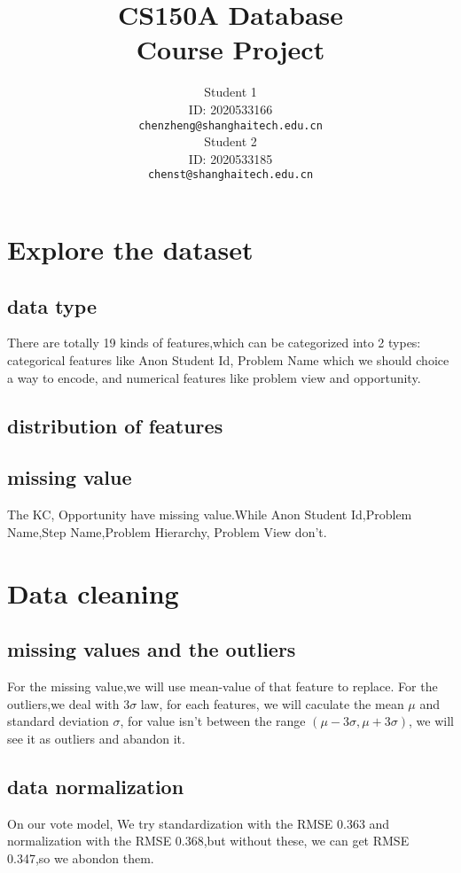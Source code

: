 \documentclass{article}
\title{CS150A Database \\Course Project}
\author{
	Student 1\\
	ID: 2020533166\\
	\texttt{chenzheng@shanghaitech.edu.cn} \\
	\And
	Student 2\\
	ID: 2020533185\\
	\texttt{chenst@shanghaitech.edu.cn}
}
\begin{document}
	
	\maketitle
	
	\begin{abstract}
		
	\end{abstract}
	
	\section{Explore the dataset}
	\subsection{data type}
	There are totally 19 kinds of features,which can be categorized into 2 types: categorical features like Anon Student Id, Problem Name which we should choice a way to encode, and numerical features like problem view and opportunity.
	\subsection{distribution of features}
	
	\subsection{missing value}
	The KC, Opportunity have missing value.While Anon Student Id,Problem Name,Step Name,Problem Hierarchy, Problem View don't.
	
	\section{Data cleaning}
	\subsection{missing values and the outliers}
	For the missing value,we will use mean-value of that feature to replace.
	For the outliers,we deal with $3\sigma$ law, for each features, we will caculate the mean $\mu$ and standard deviation $\sigma$, for value isn't between the range $(\mu-3\sigma, \mu+3\sigma)$, we will see it as outliers and abandon it.
	\subsection{data normalization}
	On our vote model, We try standardization with the RMSE 0.363  and normalization with the RMSE 0.368,but without these, we can get RMSE 0.347,so we abondon them.
\end{document}
